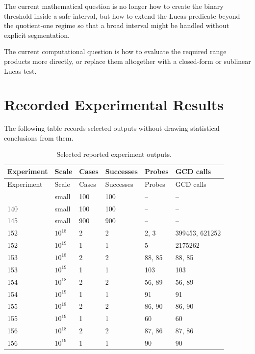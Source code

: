 \documentclass[11pt,a4paper]{article}
\begin{document}
The current mathematical question is no longer how to create the binary threshold inside a safe interval, but how to extend the Lucas predicate beyond the quotient-one regime so that a broad interval might be handled without explicit segmentation.

The current computational question is how to evaluate the required range products more directly, or replace them altogether with a closed-form or sublinear Lucas test.

\section{Recorded Experimental Results}

The following table records selected outputs without drawing statistical conclusions from them.

\begin{center}
\small
\begin{longtable}{@{}llllll@{}}
\caption{Selected reported experiment outputs.}\label{tab:results}\\
\toprule
Experiment & Scale & Cases & Successes & Probes & GCD calls \\
\midrule
\endfirsthead
\toprule
Experiment & Scale & Cases & Successes & Probes & GCD calls \\
\midrule
\endhead
\bottomrule
\endfoot
138 & small & 100 & 100 & -- & -- \\
140 & small & 100 & 100 & -- & -- \\
145 & small & 900 & 900 & -- & -- \\
152 & $10^{18}$ & 2 & 2 & 2, 3 & 399453, 621252 \\
152 & $10^{19}$ & 1 & 1 & 5 & 2175262 \\
153 & $10^{18}$ & 2 & 2 & 88, 85 & 88, 85 \\
153 & $10^{19}$ & 1 & 1 & 103 & 103 \\
154 & $10^{18}$ & 2 & 2 & 56, 89 & 56, 89 \\
154 & $10^{19}$ & 1 & 1 & 91 & 91 \\
155 & $10^{18}$ & 2 & 2 & 86, 90 & 86, 90 \\
155 & $10^{19}$ & 1 & 1 & 60 & 60 \\
156 & $10^{18}$ & 2 & 2 & 87, 86 & 87, 86 \\
156 & $10^{19}$ & 1 & 1 & 90 & 90 \\
\end{longtable}
\end{center}
\end{document}
